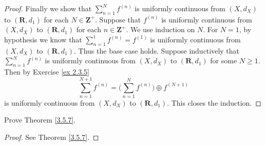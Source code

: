 \begin{proof}
    Finally we show that \(\sum_{n = 1}^N f^{(n)}\) is uniformly continuous from \((X, d_X)\) to \((\mathbf{R}, d_1)\) for each \(N \in \mathbf{Z}^+\).
    Suppose that \(f^{(n)}\) is uniformly continuous from \((X, d_X)\) to \((\mathbf{R}, d_1)\) for each \(n \in \mathbf{Z}^+\).
    We use induction on \(N\).
    For \(N = 1\), by hypothesis we know that \(\sum_{n = 1}^1 f^{(n)} = f^{(1)}\) is uniformly continuous from \((X, d_X)\) to \((\mathbf{R}, d_1)\).
    Thus the base case holds.
    Suppose inductively that \(\sum_{n = 1}^N f^{(n)}\) is uniformly continuous from \((X, d_X)\) to \((\mathbf{R}, d_1)\) for some \(N \geq 1\).
    Then by Exercise \ref{ex 2.3.5}
    \[
        \sum_{n = 1}^{N + 1} f^{(n)} = \bigg(\sum_{n = 1}^N f^{(n)}\bigg) \oplus f^{(N + 1)}
    \]
    is uniformly continuous from \((X, d_X)\) to \((\mathbf{R}, d_1)\).
    This closes the induction.
\end{proof}

\begin{exercise}\label{ex 3.5.2}
    Prove Theorem \ref{3.5.7}.
\end{exercise}

\begin{proof}
    See Theorem \ref{3.5.7}.
\end{proof}